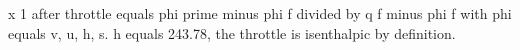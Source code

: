 x 1 after throttle equals phi prime minus phi f divided by q f minus phi f with phi equals v, u, h, s.
h equals 243.78, the throttle is isenthalpic by definition.